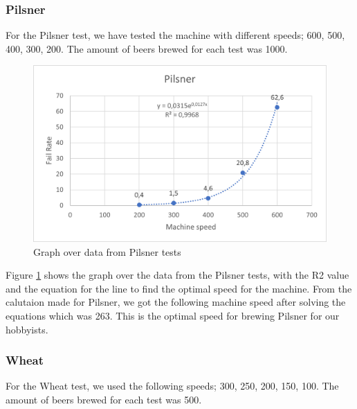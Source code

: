 \subsubsection{Pilsner}
For the Pilsner test, we have tested the machine with different speeds; 600, 500, 400, 300, 200. The amount of beers brewed for each test was 1000.

\begin{center}
    \centering
    \begin{figure}[H]
        \includegraphics[width=1\textwidth]{img/Pilsner_graph.png}
        \caption{Graph over data from Pilsner tests}
        \label{fig:Pilsner_graph}
    \end{figure}
\end{center}

Figure \ref{fig:Pilsner_graph} shows the graph over the data from the Pilsner tests, with the R2 value and the equation for the line to find the optimal speed for the machine. \newline
From the calutaion made for Pilsner, we got the following machine speed after solving the equations which was 263. This is the optimal speed for brewing Pilsner for our hobbyists. \newline

\subsubsection{Wheat}
For the Wheat test, we used the following speeds; 300, 250, 200, 150, 100. The amount of beers brewed for each test was 500.

